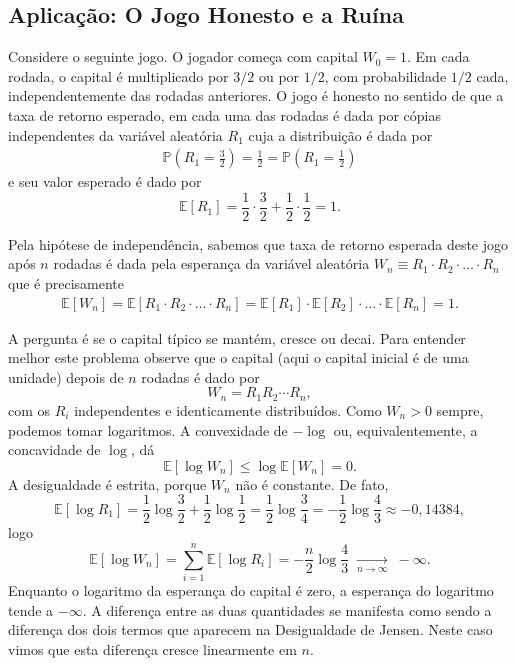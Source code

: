 \documentclass[12pt,portuguese]{article}
\theoremstyle{definition}
\theoremstyle{plainexercise}
\theoremstyle{starredexercise}
\theoremstyle{definition}
\begin{document}
\subsection{Aplicação: O Jogo Honesto e a Ruína}\label{subsec:jogo}

Considere o seguinte jogo. O jogador começa com capital $W_0=1$. Em cada
rodada, o capital é multiplicado por $3/2$ ou por $1/2$, com probabilidade
$1/2$ cada, independentemente das rodadas anteriores. O jogo é honesto no
sentido de que a taxa de retorno esperado, em cada uma das rodadas é dada por cópias independentes da variável 
aleatória $R_1$ cuja a distribuição é dada por 
\begin{align*}
\mathbb{P}\left( R_1=\frac{3}{2} \right)=\frac{1}{2} = \mathbb{P}\left( R_1=\frac{1}{2} \right)
\end{align*} 
e seu valor esperado é dado por
\[
\mathbb{E}[R_1]=\frac{1}{2}\cdot\frac{3}{2}+\frac{1}{2}\cdot\frac{1}{2}=1.
\]

Pela hipótese de independência, sabemos que taxa de retorno esperada deste jogo após $n$ rodadas
é dada pela esperança da variável aleatória $W_n\equiv R_1\cdot R_2\cdot\ldots\cdot R_n$ que é 
precisamente
\begin{align*}
\mathbb{E}[W_n]
=  
\mathbb{E}[R_1\cdot R_2\cdot\ldots\cdot R_n] 
=   
\mathbb{E}[R_1] \cdot \mathbb{E}[R_2]\cdot\ldots\cdot \mathbb{E}[R_n] 
=
1.
\end{align*}

A pergunta é se o
capital típico se mantém, cresce ou decai.
Para entender melhor este problema observe que o capital (aqui o capital inicial é de uma unidade) 
depois de $n$ rodadas é dado por 
\[
W_n=R_1R_2\cdots R_n,
\]
com os $R_i$ independentes e identicamente distribuídos. Como $W_n>0$ sempre,
podemos tomar logaritmos. A convexidade de $-\log$ ou, equivalentemente, a
concavidade de $\log$, dá
\[
\mathbb{E}[\log W_n]\leqslant\log\mathbb{E}[W_n]=0.
\]
A desigualdade é estrita, porque $W_n$ não é constante. De fato,
\[
\mathbb{E}[\log R_1]
=
\frac{1}{2}\log\frac{3}{2}+\frac{1}{2}\log\frac{1}{2}
=
\frac{1}{2}\log\frac{3}{4}
=
-\frac{1}{2}\log\frac{4}{3}
\approx-0{,}14384,
\]
logo
\begin{equation}\label{eq:jogo-log}
\mathbb{E}[\log W_n]
=
\sum_{i=1}^{n}\mathbb{E}[\log R_i]
=
-\frac{n}{2}\log\frac{4}{3}
\;\xrightarrow[n\to\infty]{}\;-\infty.
\end{equation}
Enquanto o logaritmo da esperança do capital é zero, a esperança do logaritmo
tende a $-\infty$. A diferença entre as duas quantidades se manifesta como
sendo a diferença dos dois termos que aparecem na Desigualdade de Jensen. 
Neste caso vimos que esta diferença cresce linearmente em $n$.
\end{document}
